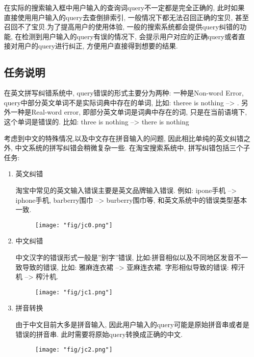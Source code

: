 在实际的搜索输入框中用户输入的查询词query不一定都是完全正确的, 此时如果直接使用用户输入的query去查倒排索引, 一般情况下都无法召回正确的宝贝, 甚至召回不了宝贝.为了提高用户的使用体验, 一般的搜索系统都会提供query纠错的功能, 在检测到用户输入的query有误的情况下, 会提示用户对应的正确query或者直接对用户的query进行纠正, 方便用户直接得到想要的结果. 

\subsection{任务说明}

在英文拼写纠错系统中, query错误的形式主要分为两种: 一种是Non-word Error, query中部分英文单词不是实际词典中存在的单词, 比如: theree is nothing  --> . 另外一种是Real-word error, 即部分英文单词是词典中存在的词, 只是在当前语境下, 这个单词是错误的. 比如: three is nothing --> there is nothing

考虑到中文的特殊情况,以及中文存在拼音输入的问题, 因此相比单纯的英文纠错之外, 中文系统的拼写纠错会稍微复杂一些. 在淘宝搜索系统中, 拼写纠错包括三个子任务:

\begin{enumerate}
\item 英文纠错

淘宝中常见的英文输入错误主要是英文品牌输入错误. 例如: ipone手机 --> iphone手机, barberry围巾 --> burberry围巾等, 和英文系统中的错误类型基本一致.
\begin{figure}[!h]
	\centering
	\texttt{[image: "fig/jc0.png"]}
	\caption{}
	\label{fig:jc0}
\end{figure}

\item 中文纠错

中文汉字的错误形式一般是”别字”错误, 比如:拼音相似以及不同地区发音不一致导致的错误, 比如: 雅麻连衣裙 --> 亚麻连衣裙. 字形相似导致的错误: 榨汗机 --> 榨汁机. 

\begin{figure}[!h]
	\centering
	\texttt{[image: "fig/jc1.png"]}
	\caption{}
	\label{fig:jc1}
\end{figure}

\item 拼音转换

由于中文目前大多是拼音输入, 因此用户输入的query可能是原始拼音串或者是错误的拼音串. 此时需要将原始query转换成正确的中文. 

\begin{figure}[!h]
	\centering
	\texttt{[image: "fig/jc2.png"]}
	\caption{}
	\label{fig:jc2}
\end{figure}

\end{enumerate}

